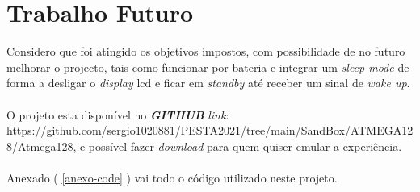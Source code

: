 \section{Trabalho Futuro}
Considero que foi atingido os objetivos impostos, com possibilidade de no futuro melhorar o projecto, tais como funcionar por bateria e integrar um \textit{sleep mode} de forma a desligar o \textit{display} \acs{lcd} e ficar em \textit{standby} até receber um sinal de \textit{wake up}.
\\
\\
O projeto esta disponível no \textit{\textbf{GITHUB}} \textit{link}: \url{https://github.com/sergio1020881/PESTA2021/tree/main/SandBox/ATMEGA128/Atmega128}, e possível fazer \textit{download} para quem quiser emular a experiência.
\\
\\
Anexado ( \ref{anexo-code} )
vai todo o código utilizado neste projeto.
\begin{comment}
Sensitivity,Long-Term Drift e Temperature Effects (Span temperature hysteresis).
\end{comment}
